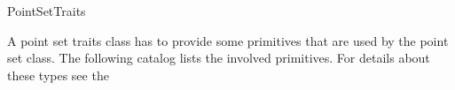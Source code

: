 \begin{ccRefConcept} {PointSetTraits}


A point set traits class has to provide some primitives that are used by the point set class.
The following catalog lists the involved primitives.
For details about these types see the %

\ccTypes

%
{ }

%
{ }

%
{ }

%
{ }

%
{ }	
	
%
{ }

%
{ }

%
{ }	
	
%
{ }

%
{ }

%
{ }

\end{ccRefConcept}

